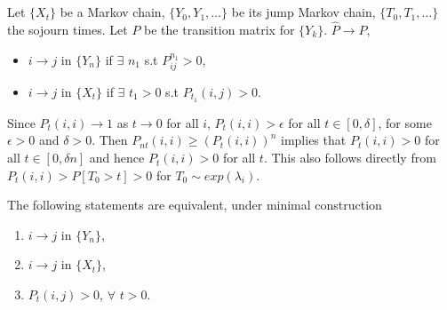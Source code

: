 \documentclass[all-lectures.tex]{subfiles}
\begin{document}

\setcounter{section}{3}
\setcounter{subsection}{0}

\section*{}

Let $\{X_t\}$ be a Markov chain, $\{Y_0, Y_1, \dots\}$ be its jump Markov chain, $\{T_0, T_1, \dots\}$ the sojourn times. Let $P$ be the transition matrix for $\{Y_k\}$.
$\hat{P} \to P$,
\begin{itemize}
\item $i \to j$ in $\{Y_n\}$ if $\exists$ $n_1$ s.t $P^{n_1}_{ij} > 0$,
\item $i \to j$ in $\{X_t\}$ if $\exists$ $t_1 >0$ s.t $P_{t_1}(i,j) > 0$.
\end{itemize}

Since $P_t(i,i)\to 1$ as $t \to 0$ for all $i$, $P_t(i,i)  > \epsilon$ for all $t  \in [0, \delta]$, for some $\epsilon > 0$ and $\delta > 0$.
Then $P_{nt}(i,i) \ge (P_{t}(i,i))^n$ implies that $P_t(i,i)  >0$ for all $t \in [0, \delta n]$ and hence $P_t(i,i) > 0$ for all $t$.
This also follows directly from $P_t(i,i)  > P[T_0 >t] > 0$ for $T_0 \sim exp(\lambda_{i})$.
\begin{prop}
The following statements are equivalent, under minimal construction
\begin{enumerate}
\item $i \to j$ in $\{Y_n\}$,
\item $i \to j$ in $\{X_t\}$,
\item $P_t(i,j)  > 0 $, $\forall$ $ t>0$.
\end{enumerate}
\end{prop}
\end{document}
